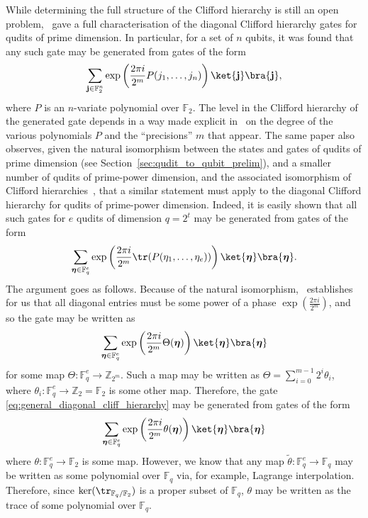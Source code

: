 \documentclass[11pt]{article}
\theoremstyle{definition}
\begin{document}
While determining the full structure of the Clifford hierarchy is still an open problem,~\cite{cui2017diagonal} gave a full characterisation of the diagonal Clifford hierarchy gates for qudits of prime dimension. In particular, for a set of $n$ qubits, it was found that any such gate may be generated from gates of the form
\begin{equation}
    \sum_{\mathbf{j}\in\mathbb{F}_2^n}\exp\left(\frac{2\pi i}{2^m}P(j_1, \ldots, j_n)\right)\ket{\mathbf{j}}\bra{\mathbf{j}},
\end{equation}
where $P$ is an $n$-variate polynomial over $\mathbb{F}_2$. The level in the Clifford hierarchy of the generated gate depends in a way made explicit in~\cite{cui2017diagonal} on the degree of the various polynomials $P$ and the ``precisions'' $m$ that appear. The same paper also observes, given the natural isomorphism between the states and gates of qudits of prime dimension (see Section~\ref{sec:qudit_to_qubit_prelim}), and a smaller number of qudits of prime-power dimension, and the associated isomorphism of Clifford hierarchies~\cite{gottesman2016surviving}, that a similar statement must apply to the diagonal Clifford hierarchy for qudits of prime-power dimension. Indeed, it is easily shown that all such gates for $e$ qudits of dimension $q=2^t$ may be generated from gates of the form
\begin{equation}
    \sum_{\boldsymbol{\eta} \in \mathbb{F}_q^e}\exp\left(\frac{2\pi i}{2^m}\tr(P(\eta_1, \ldots, \eta_e))\right)\ket{\boldsymbol{\eta}}\bra{\boldsymbol{\eta}}.
\end{equation}
The argument goes as follows. Because of the natural isomorphism,~\cite{cui2017diagonal} establishes for us that all diagonal entries must be some power of a phase $\exp\left(\frac{2\pi i}{2^m}\right)$, and so the gate may be written as
\begin{equation}\label{eq:general_diagonal_cliff_hierarchy}
    \sum_{\boldsymbol{\eta}\in \mathbb{F}_q^e}\exp\left(\frac{2\pi i}{2^m}\Theta(\boldsymbol{\eta})\right)\ket{\boldsymbol{\eta}}\bra{\boldsymbol{\eta}}
\end{equation}
for some map $\Theta:\mathbb{F}_q^e \to \mathbb{Z}_{2^m}$. Such a map may be written as $\Theta = \sum_{i=0}^{m-1}2^i\theta_i$, where $\theta_i:\mathbb{F}_q^e \to \mathbb{Z}_2 = \mathbb{F}_2$ is some other map. Therefore, the gate \eqref{eq:general_diagonal_cliff_hierarchy} may be generated from gates of the form
\begin{equation}
    \sum_{\boldsymbol{\eta}\in \mathbb{F}_q^e}\exp\left(\frac{2\pi i}{2^m}\theta(\boldsymbol{\eta})\right)\ket{\boldsymbol{\eta}}\bra{\boldsymbol{\eta}}
\end{equation}
where $\theta:\mathbb{F}_q^e \to \mathbb{F}_2$ is some map. However, we know that any map $\tilde{\theta}: \mathbb{F}_q^e \to \mathbb{F}_q$ may be written as some polynomial over $\mathbb{F}_q$ via, for example, Lagrange interpolation. Therefore, since $\ker(\tr_{\mathbb{F}_q/\mathbb{F}_2})$ is a proper subset of $\mathbb{F}_q$, $\theta$ may be written as the trace of some polynomial over $\mathbb{F}_q$.
\end{document}
